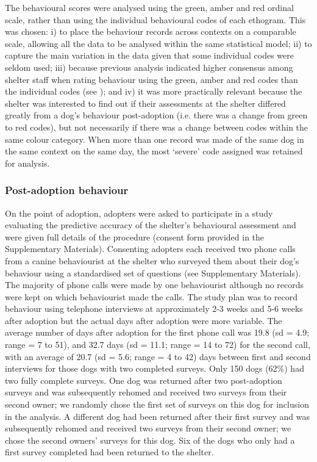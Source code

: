\documentclass[12pt]{article}
\begin{document}
The behavioural scores were analysed using the green, amber and red ordinal scale, rather than using the individual behavioural codes of each ethogram. This was chosen: i) to place the behaviour records across contexts on a comparable scale, allowing all the data to be analysed within the same statistical model; ii) to capture the main variation in the data given that some individual codes were seldom used; iii) because previous analysis indicated higher consensus among shelter staff when rating behaviour using the green, amber and red codes than the individual codes (see \cite{goold2017modelling}); and iv) it was more practically relevant because the shelter was interested to find out if their assessments at the shelter differed greatly from a dog's behaviour post-adoption (i.e. there was a change from green to red codes), but not necessarily if there was a change between codes within the same colour category. When more than one record was made of the same dog in the same context on the same day, the most `severe' code assigned was retained for analysis.

\subsubsection{Post-adoption behaviour}
On the point of adoption, adopters were asked to participate in a study evaluating the predictive accuracy of the shelter's behavioural assessment and were given full details of the procedure (consent form provided in the Supplementary Materials). Consenting adopters each received two phone calls from a canine behaviourist at the shelter who surveyed them about their dog's behaviour using a standardised set of questions (see Supplementary Materials). The majority of phone calls were made by one behaviourist although no records were kept on which behaviourist made the calls. The study plan was to record behaviour using telephone interviews at approximately 2-3 weeks and 5-6 weeks after adoption but the actual days after adoption were more variable. The average number of days after adoption for the first phone call was 19.8 (sd = 4.9; range = 7 to 51), and 32.7 days (sd = 11.1; range = 14 to 72) for the second call, with an average of 20.7 (sd = 5.6; range = 4 to 42) days between first and second interviews for those dogs with two completed surveys. Only 150 dogs (62\%) had two fully complete surveys. One dog was returned after two post-adoption surveys and was subsequently rehomed and received two surveys from their second owner; we randomly chose the first set of surveys on this dog for inclusion in the analysis. A different dog had been returned after their first survey and was subsequently rehomed and received two surveys from their second owner; we chose the second owners' surveys for this dog. Six of the dogs who only had a first survey completed had been returned to the shelter.
\end{document}
